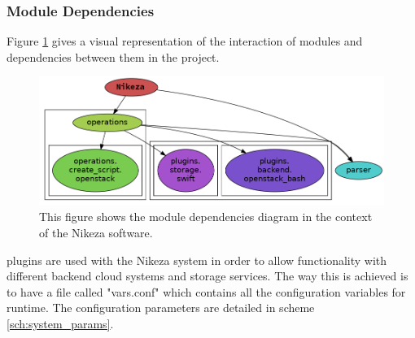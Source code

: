 \subsubsection{Module Dependencies}

Figure \ref{fig:module_deps} gives a visual representation of the interaction of modules and dependencies between them in the project.

\begin{figure}[ht!]
\centering
\includegraphics[width=\textwidth]{Figures/3_module_deps_new.png}
\decoRule
\caption[Nikeza Software Module Dependencies]{This figure shows the module dependencies diagram in the context of the Nikeza software.}
\label{fig:module_deps}
\end{figure}

plugins are used with the Nikeza system in order to allow functionality with different backend cloud systems and storage services. The way this is achieved is to have a file called "vars.conf" which contains all the configuration variables for runtime. The configuration parameters are detailed in scheme \ref{sch:system_params}.


